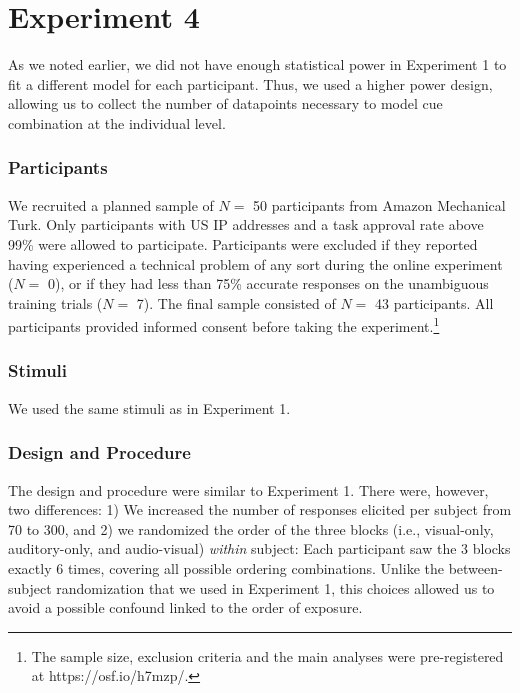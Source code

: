 \documentclass[english,,man,floatsintext]{apa6}
\let\rmarkdownfootnote\footnote%
\def\footnote{\protect\rmarkdownfootnote}
\theoremstyle{definition}
\theoremstyle{definition}
\theoremstyle{definition}
\theoremstyle{remark}
\begin{document}
\section{Experiment 4}\label{experiment-4}

As we noted earlier, we did not have enough statistical power in
Experiment 1 to fit a different model for each participant. Thus, we
used a higher power design, allowing us to collect the number of
datapoints necessary to model cue combination at the individual level.

\subsubsection{Participants}\label{participants-3}

We recruited a planned sample of \(N=\) 50 participants from Amazon
Mechanical Turk. Only participants with US IP addresses and a task
approval rate above 99\% were allowed to participate. Participants were
excluded if they reported having experienced a technical problem of any
sort during the online experiment (\(N=\) 0), or if they had less than
75\% accurate responses on the unambiguous training trials (\(N=\) 7).
The final sample consisted of \(N =\) 43 participants. All participants
provided informed consent before taking the
experiment.\footnote{The sample size, exclusion criteria and the main analyses were pre-registered at https://osf.io/h7mzp/.}

\subsubsection{Stimuli}\label{stimuli-1}

We used the same stimuli as in Experiment 1.

\subsubsection{Design and Procedure}\label{design-and-procedure-1}

The design and procedure were similar to Experiment 1. There were,
however, two differences: 1) We increased the number of responses
elicited per subject from 70 to 300, and 2) we randomized the order of
the three blocks (i.e., visual-only, auditory-only, and audio-visual)
\emph{within} subject: Each participant saw the 3 blocks exactly 6
times, covering all possible ordering combinations. Unlike the
between-subject randomization that we used in Experiment 1, this choices
allowed us to avoid a possible confound linked to the order of exposure.
\end{document}
